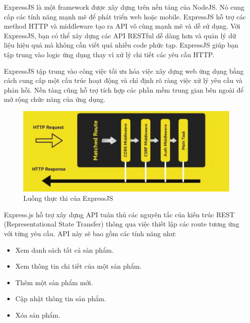 ExpressJS là một framework được xây dựng trên nền tảng của NodeJS. Nó cung cấp các tính năng mạnh mẽ để phát triển web hoặc mobile. ExpressJS hỗ trợ các method HTTP và middleware tạo ra API vô cùng mạnh mẽ và dễ sử dụng. Với ExpressJS, bạn có thể xây dựng các API RESTful dễ dàng hơn và quản lý dữ liệu hiệu quả mà không cần viết quá nhiều code phức tạp. ExpressJS giúp bạn tập trung vào logic ứng dụng thay vì xử lý chi tiết các yêu cầu HTTP.

ExpressJS tập trung vào công việc tối ưu hóa việc xây dựng web ứng dụng bằng cách cung cấp một cấu trúc hoạt động và chỉ định rõ ràng việc xử lý yêu cầu và phản hồi. Nền tảng cũng hỗ trợ tích hợp các phần mềm trung gian bên ngoài để mở rộng chức năng của ứng dụng. 

\begin{figure}[H]
    \centering
    \includegraphics[scale=0.5]{img/ExpressJS-workflow.png}
    \caption{Luồng thực thi của ExpressJS}
    \label{fig:expressjs}
\end{figure}

Express.js hỗ trợ xây dựng API tuân thủ các nguyên tắc của kiến trúc REST (Representational State Transfer) thông qua việc thiết lập các route tương ứng với từng yêu cầu. API này sẽ bao gồm các tính năng như:
\begin{itemize}
    \item Xem danh sách tất cả sản phẩm.
    \item Xem thông tin chi tiết của một sản phẩm.
    \item Thêm một sản phẩm mới.
    \item Cập nhật thông tin sản phẩm.
    \item Xóa sản phẩm.
\end{itemize}

